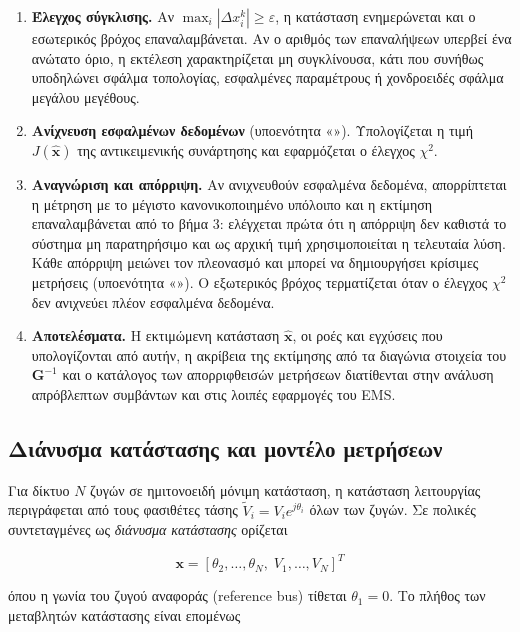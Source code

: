 \begin{enumerate}
\item \textbf{Έλεγχος σύγκλισης.} Αν $\max_i |\Delta x_i^{k}| \ge \varepsilon$, η κατάσταση
      ενημερώνεται και ο εσωτερικός βρόχος επαναλαμβάνεται. Αν ο αριθμός των επαναλήψεων
      υπερβεί ένα ανώτατο όριο, η εκτέλεση χαρακτηρίζεται μη συγκλίνουσα, κάτι που συνήθως
      υποδηλώνει σφάλμα τοπολογίας, εσφαλμένες παραμέτρους ή χονδροειδές σφάλμα μεγάλου
      μεγέθους.
\item \textbf{Ανίχνευση εσφαλμένων δεδομένων} (υποενότητα «»). Υπολογίζεται η τιμή
      $J(\hat{\mathbf{x}})$ της αντικειμενικής συνάρτησης και εφαρμόζεται ο έλεγχος
      $\chi^2$.
\item \textbf{Αναγνώριση και απόρριψη.} Αν ανιχνευθούν εσφαλμένα δεδομένα, απορρίπτεται η
      μέτρηση με το μέγιστο κανονικοποιημένο υπόλοιπο και η εκτίμηση επαναλαμβάνεται από το
      βήμα 3: ελέγχεται πρώτα ότι η απόρριψη δεν καθιστά το σύστημα μη παρατηρήσιμο και ως
      αρχική τιμή χρησιμοποιείται η τελευταία λύση. Κάθε απόρριψη μειώνει τον πλεονασμό
      και μπορεί να δημιουργήσει κρίσιμες μετρήσεις (υποενότητα «»). Ο εξωτερικός
      βρόχος τερματίζεται όταν ο έλεγχος $\chi^2$ δεν ανιχνεύει πλέον εσφαλμένα δεδομένα.
\item \textbf{Αποτελέσματα.} Η εκτιμώμενη κατάσταση $\hat{\mathbf{x}}$, οι ροές και εγχύσεις
      που υπολογίζονται από αυτήν, η ακρίβεια της εκτίμησης από τα διαγώνια στοιχεία του
      $\mathbf{G}^{-1}$ και ο κατάλογος των απορριφθεισών μετρήσεων διατίθενται στην ανάλυση
      απρόβλεπτων συμβάντων και στις λοιπές εφαρμογές του EMS.
\end{enumerate}

\subsection{Διάνυσμα κατάστασης και μοντέλο μετρήσεων}

Για δίκτυο $N$ ζυγών σε ημιτονοειδή μόνιμη κατάσταση, η κατάσταση λειτουργίας περιγράφεται από
τους φασιθέτες τάσης $\tilde{V}_i = V_i e^{j\theta_i}$ όλων των ζυγών. Σε πολικές συντεταγμένες
ως \emph{διάνυσμα κατάστασης} ορίζεται

\begin{equation}
\mathbf{x} = \left[\theta_2, \ldots, \theta_N,\; V_1, \ldots, V_N\right]^{T}
\label{eq:statevec}
\end{equation}

όπου η γωνία του ζυγού αναφοράς (reference bus) τίθεται $\theta_1 = 0$. Το πλήθος των
μεταβλητών κατάστασης είναι επομένως

